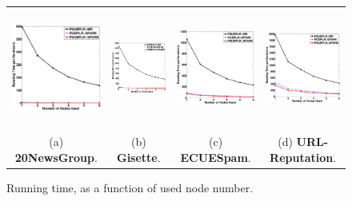 \documentclass[10pt, conference, compsocconf]{IEEEtran}
\begin{document}
\begin{figure}[tb]
\begin{center}
\begin{tabular}{cccc}
   \includegraphics[height=3.9cm,width=4.5cm]{img/20NewsGroup_time.eps}&
   \hspace{-0.6cm}\includegraphics[height=3.9cm,width=4.5cm]{img/Gisette_time.eps}&
   \hspace{-0.6cm}\includegraphics[height=3.9cm,width=4.5cm]{img/ECUESpam_time.eps}&
   \hspace{-0.6cm}\includegraphics[height=3.9cm,width=4.5cm]{img/URL-Reputation_time.eps}\\
   (a) \textbf{20NewsGroup}. & \hspace{-0.3cm}(b) \textbf{Gisette}. & \hspace{-0.3cm}(c) \textbf{ECUESpam}. & \hspace{-0.3cm}(d) \textbf{URL-Reputation}.\\
   \end{tabular}
\end{center}\vspace{-0.3cm}
   \caption{Running time, as a function of used node number.}\vspace{-0.5cm}
\label{fig:time}
\end{figure}
\end{document}
